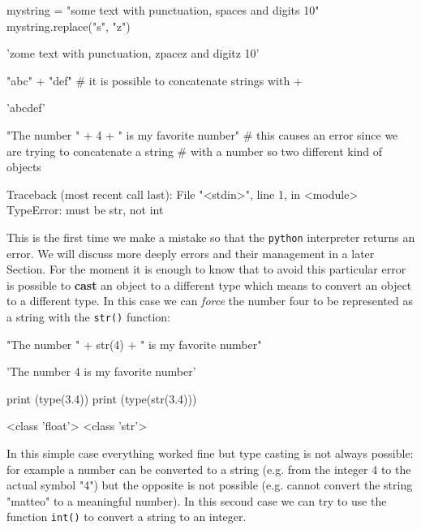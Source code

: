 \begin{ipython}
mystring = "some text with punctuation, spaces and digits 10" 
mystring.replace("s", "z")
\end{ipython}
\begin{ioutput}
'zome text with punctuation, zpacez and digitz 10'
\end{ioutput}

\begin{ipython}
"abc" + "def" # it is possible to concatenate strings with + 
\end{ipython}
\begin{ioutput}
'abcdef'
\end{ioutput}

\begin{ipython}
"The number " + 4 + " is my favorite number"
# this causes an error since we are trying to concatenate a string
# with a number so two different kind of objects
\end{ipython}
\begin{ioutput} 
Traceback (most recent call last):
  File "<stdin>", line 1, in <module>
TypeError: must be str, not int
\end{ioutput}

This is the first time we make a mistake so that the \texttt{python} interpreter returns an error. We will discuss more deeply errors and their management in a later Section. 
For the moment it is enough to know that to avoid this particular error is possible to \textbf{cast} an object to a different type which means to convert an object to a different type. In this case we can \emph{force} the number four to be represented as a string with the \texttt{str()} function:

\begin{ipython}
"The number " + str(4) + " is my favorite number"
\end{ipython}
\begin{ioutput}
'The number 4 is my favorite number'
\end{ioutput}

\begin{ipython}
print (type(3.4)) 
print (type(str(3.4)))
\end{ipython}
\begin{ioutput}
<class 'float'>
<class 'str'>	
\end{ioutput}

In this simple case everything worked fine but type casting is not always possible: for example a number can be converted to a string (e.g. from the integer 4 to the actual symbol "4") but the opposite is not possible (e.g. cannot convert the string "matteo" to a meaningful number). In this second case we can try to use the function \texttt{int()} to convert a string to an integer.

